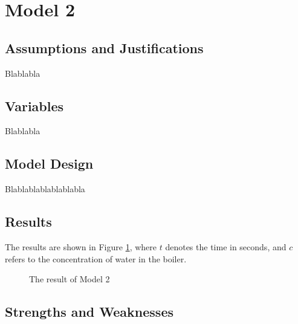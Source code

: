 \documentclass[12pt]{article}
\begin{document}
\section{Model 2}

	\subsection{Assumptions and Justifications}
	
		Blablabla
	
	
	
	\subsection{Variables}
	
		Blablabla
	
	
	
	\subsection{Model Design}
	
		Blablablablablablabla
	
	
	
	\subsection{Results}
	
		The results are shown in Figure \ref{fig:result}, where $t$ denotes the time in seconds, and $c$ refers to the concentration of water in the boiler.
		
		\begin{figure}[htbp]
			\centering
			\caption{The result of Model 2}\label{fig:result}
		\end{figure}
		
		\begin{figure}
			\centering
		\end{figure}
	
	
	\subsection{Strengths and Weaknesses}
	
\end{document}
